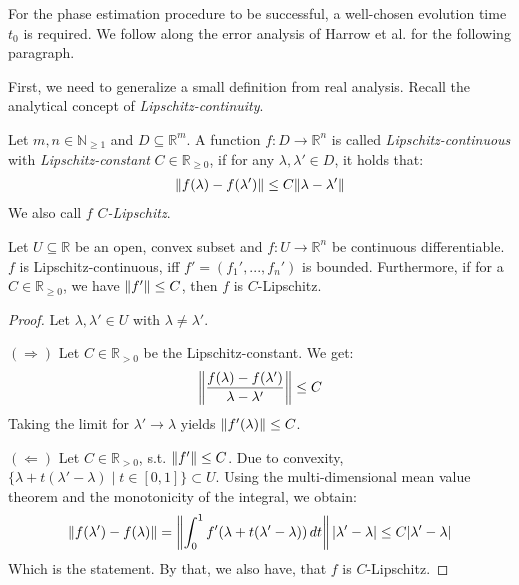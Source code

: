 For the phase estimation procedure to be successful, a well-chosen evolution time \(t_0\) is required. We follow along the error analysis of Harrow et al. \cite[pp. 7-10]{Harrow2008} for the following paragraph.

First, we need to generalize a small definition from real analysis. Recall the analytical concept of \emph{Lipschitz-continuity}.

\begin{definition}
    Let \(m, n \in \mathbb{N}_{\geq 1}\) and \(D \subseteq \mathbb{R}^m\). A function \(f\colon D \to \mathbb{R}^n\) is called \emph{Lipschitz-continuous} with \emph{Lipschitz-constant} \(C \in \mathbb{R}_{\geq 0}\), if for any \(\lambda, \lambda' \in D\), it holds that:
    \begin{align}
        \norm{f(\lambda)-f(\lambda')} \leq C \norm{\lambda - \lambda'}
    \end{align}
    We also call \(f\) \emph{\(C\)-Lipschitz}.
\end{definition}

\begin{theorem} \label{lipschitz_continuity_iff_bounded_derivative}
    Let \(U \subseteq \mathbb{R}\) be an open, convex subset and \(f\colon U \to \mathbb{R}^n\) be continuous differentiable. \(f\) is Lipschitz-continuous, iff \(f' = (f_1', ..., f_n')\) is bounded. Furthermore, if for a \(C \in \mathbb{R}_{\geq 0}\), we have \(\norm{f'} \leq C\), then \(f\) is \(C\)-Lipschitz.
\end{theorem}

\begin{proof}
    Let \(\lambda, \lambda' \in U\) with \(\lambda \neq \lambda'\).
    
    \((\Rightarrow)\) Let \(C \in \mathbb{R}_{> 0}\) be the Lipschitz-constant. We get:
    \begin{align}
        \norm{\frac{f(\lambda)-f(\lambda')}{\lambda-\lambda'}} \leq C
    \end{align}
    Taking the limit for \(\lambda' \to \lambda\) yields \(\norm{f'(\lambda)} \leq C\).

    \((\Leftarrow)\) Let \(C \in \mathbb{R}_{> 0}\), s.t. \(\norm{f'} \leq C\). Due to convexity, \(\{\lambda + t(\lambda'-\lambda) \mid t \in [0, 1]\} \subset U\). Using the multi-dimensional mean value theorem \cite[p. 84]{Forster2017} and the monotonicity of the integral, we obtain:
    \begin{align}
        \norm{f(\lambda')-f(\lambda)} = \norm{\int_0^1 f'(\lambda + t(\lambda'-\lambda)) \, dt} \left|\lambda'-\lambda\right| \leq C |\lambda' - \lambda|
    \end{align}
    Which is the statement. By that, we also have, that \(f\) is \(C\)-Lipschitz.
\end{proof}

